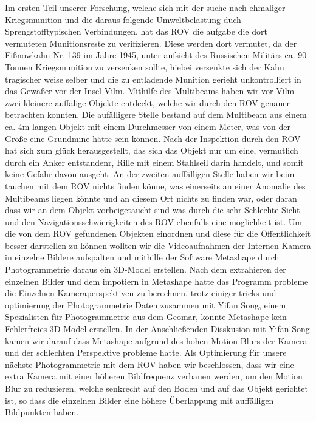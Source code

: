 Im ersten Teil unserer Forschung, welche sich mit der suche nach ehmaliger Kriegsmunition und die daraus folgende Umweltbelastung duch Sprengstofftypischen Verbindungen,
 hat das ROV die aufgabe die dort vermuteten Munitionsreste zu verifizieren. Diese werden dort vermutet, da der Fißnowkahn Nr. 139 im Jahre 1945, unter aufsicht des Russischen Militärs ca. 90 Tonnen Kriegsmunition zu versenken sollte, hiebei versenkte sich der Kahn tragischer weise selber und die zu entladende Munition gerieht unkontrolliert in das Gewäßer vor der Insel Vilm.
Mithilfe des Multibeams haben wir vor Vilm zwei kleinere auffälige Objekte entdeckt, welche wir durch den ROV genauer betrachten konnten. Die aufälligere Stelle bestand auf dem Multibeam aus einem ca. 4m langen Objekt mit einem Durchmesser von einem Meter, was von der Größe eine Grundmine hätte sein können.
Nach der Inspektion durch den ROV hat sich zum glück herausgestellt, das sich das Objekt nur um eine, vermutlich durch ein Anker entstandenr, Rille mit einem Stahlseil darin handelt, und somit keine Gefahr davon ausgeht.
An der zweiten auffälligen Stelle haben wir beim tauchen mit dem ROV nichts finden könne, was einerseits an einer Anomalie des Multibeams liegen könnte und an diesem Ort nichts zu finden war, oder daran dass wir an dem Objekt vorbeigetaucht sind was durch die sehr Schlechte Sicht und den Navigationsschwierigkeiten des ROV ebenfalls eine möglichkeit ist.
Um die von dem ROV gefundenen Objekten einordnen und diese für die Öffentlichkeit besser darstellen zu können wollten wir die Videoaufnahmen der Internen Kamera in einzelne Bildere aufspalten und mithilfe der Software Metashape durch Photogrammetrie daraus ein 3D-Model erstellen. 
Nach dem extrahieren der einzelnen Bilder und dem impotiern in Metashape hatte das Programm probleme die Einzelnen Kameraperspektiven zu berechnen, trotz einiger tricks und optimierung der Photogrammetrie Daten zusammen mit Yifan Song, einem Spezialisten für Photogrammetrie aus dem Geomar, konnte Metashape kein Fehlerfreies 3D-Model erstellen.
In der Anschließenden Disskusion mit Yifan Song kamen wir darauf dass Metashape aufgrund des hohen Motion Blurs der Kamera und der schlechten Perspektive probleme hatte. 
Als Optimierung für unsere nächste Photogrammetrie mit dem ROV haben wir beschlossen, dass wir eine extra Kamera mit einer höheren Bildfrequenz verbauen werden, um den Motion Blur zu reduzieren, welche senkrecht auf den Boden und auf das Objekt gerichtet ist, so dass die einzelnen Bilder eine höhere Überlappung mit auffälligen Bildpunkten haben.
\\

